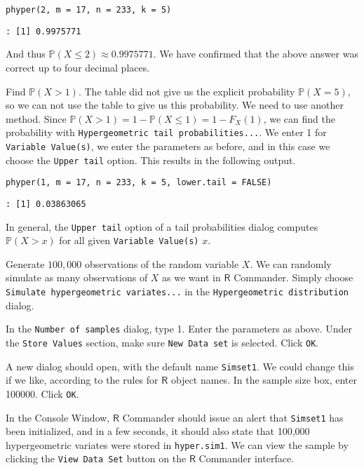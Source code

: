 \begin{verbatim}
phyper(2, m = 17, n = 233, k = 5)
\end{verbatim}

\begin{verbatim}
: [1] 0.9975771
\end{verbatim}

And thus \(\mathbb{P}(X\leq2)\approx 0.9975771\). We have confirmed
that the above answer was correct up to four decimal places.

Find \(\mathbb{P}(X>1)\). The table did not give us the explicit
probability \(\mathbb{P}(X=5)\), so we can not use the table to give
us this probability. We need to use another method. Since
\(\mathbb{P}(X>1)=1-\mathbb{P}(X\leq1)=1-F_{X}(1)\), we can find the
probability with \texttt{Hypergeometric tail probabilities...}. We enter 1
for \texttt{Variable Value(s)}, we enter the parameters as before, and in
this case we choose the \texttt{Upper tail} option. This results in the
following output.

\begin{verbatim}
phyper(1, m = 17, n = 233, k = 5, lower.tail = FALSE)
\end{verbatim}

\begin{verbatim}
: [1] 0.03863065
\end{verbatim}

In general, the \texttt{Upper tail} option of a tail probabilities dialog
computes \(\mathbb{P}(X > x)\) for all given \texttt{Variable Value(s)}
\(x\).  

Generate \(100,000\) observations of the random variable
\(X\).  We can randomly simulate as many observations of \(X\) as we want in \(\mathsf{R}\) Commander. Simply choose \texttt{Simulate hypergeometric variates...} in the \texttt{Hypergeometric distribution} dialog. 

In the \texttt{Number of samples} dialog, type 1. Enter the parameters as
above. Under the \texttt{Store Values} section, make sure \texttt{New Data set} is
selected. Click \texttt{OK}.

A new dialog should open, with the default name \texttt{Simset1}.  We could
change this if we like, according to the rules for \(\mathsf{R}\)
object names. In the sample size box, enter 100000. Click \texttt{OK}.

In the Console Window, \(\mathsf{R}\) Commander should issue an alert
that \texttt{Simset1} has been initialized, and in a few seconds, it should
also state that 100,000 hypergeometric variates were stored in
\texttt{hyper.sim1}. We can view the sample by clicking the \texttt{View Data Set}
button on the \(\mathsf{R}\) Commander interface.

